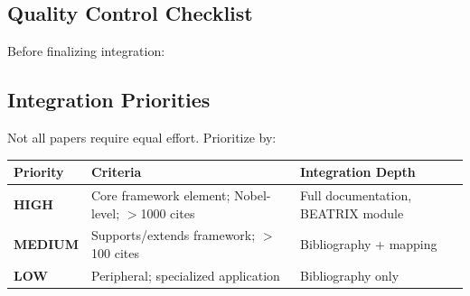 \subsection{Quality Control Checklist}

Before finalizing integration:

\begin{center}
\end{center}

\subsection{Integration Priorities}

Not all papers require equal effort. Prioritize by:

\begin{center}
\renewcommand{\arraystretch}{1.3}
\begin{tabular}{|l|l|l|}
\hline
\textbf{Priority} & \textbf{Criteria} & \textbf{Integration Depth} \\
\hline
\textbf{HIGH} & Core framework element; Nobel-level; $>$1000 cites & Full documentation, BEATRIX module \\
\textbf{MEDIUM} & Supports/extends framework; $>$100 cites & Bibliography + mapping \\
\textbf{LOW} & Peripheral; specialized application & Bibliography only \\
\hline
\end{tabular}
\end{center}

